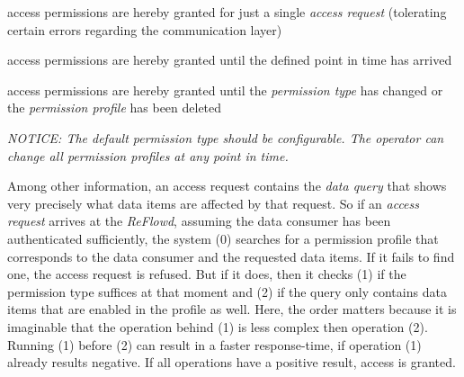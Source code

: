 \documentclass[12pt,english,a4paper,titlepage,cleardoublepage=empty,dottedtoc]{report}
\providecommand{\tightlist}{%
  \setlength{\itemsep}{0pt}\setlength{\parskip}{0pt}}
\begin{document}
\begin{description}
\tightlist
\item[\emph{one-time-only}]
access permissions are hereby granted for just a single \emph{access
request} (tolerating certain errors regarding the communication layer)
\item[\emph{expires-on-date}]
access permissions are hereby granted until the defined point in time
has arrived
\item[\emph{until-further-notice}]
access permissions are hereby granted until the \emph{permission type}
has changed or the \emph{permission profile} has been deleted
\end{description}

\emph{NOTICE: The default permission type should be configurable. The
operator can change all permission profiles at any point in time.}

Among other information, an access request contains the \emph{data
query} that shows very precisely what data items are affected by that
request. So if an \emph{access request} arrives at the \emph{ReFlowd},
assuming the data consumer has been authenticated sufficiently, the
system (0) searches for a permission profile that corresponds to the
data consumer and the requested data items. If it fails to find one, the
access request is refused. But if it does, then it checks (1) if the
permission type suffices at that moment and (2) if the query only
contains data items that are enabled in the profile as well. Here, the
order matters because it is imaginable that the operation behind (1) is
less complex then operation (2). Running (1) before (2) can result in a
faster response-time, if operation (1) already results negative. If all
operations have a positive result, access is granted.
\end{document}
